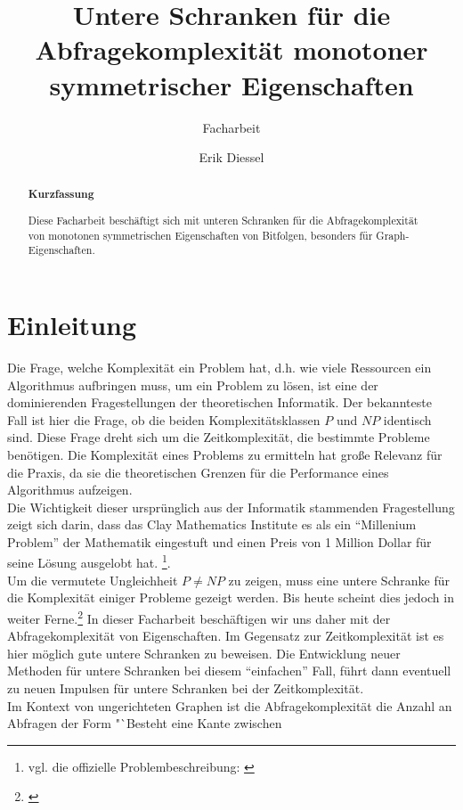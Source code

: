 \documentclass[a4paper]{scrreprt}
\title{Untere Schranken für die Abfragekomplexität 
       monotoner symmetrischer Eigenschaften}
\subtitle{Facharbeit}
\author{Erik Diessel}
\theoremstyle{definition}
\begin{document}
\maketitle

\begin{abstract}
\begin{center}
\bf{Kurzfassung}
\end{center}
Diese Facharbeit beschäftigt sich mit unteren Schranken
für die Abfragekomplexität von monotonen symmetrischen
Eigenschaften von Bitfolgen, besonders für Graph-Eigenschaften.
\end{abstract}

\tableofcontents
\thispagestyle{empty}

\chapter{Einleitung}
Die Frage, welche Komplexität ein Problem hat, d.h.
wie viele Ressourcen ein Algorithmus aufbringen muss,
um ein Problem zu lösen, ist eine der dominierenden
Fragestellungen der theoretischen Informatik.
Der bekannteste Fall ist hier die Frage, ob die beiden
Komplexitätsklassen $P$ und $NP$ identisch sind. Diese
Frage dreht sich um die Zeitkomplexität, die bestimmte
Probleme benötigen. Die Komplexität eines Problems zu ermitteln hat
große Relevanz für die Praxis, da sie die theoretischen
Grenzen für die Performance eines Algorithmus aufzeigen. \\
Die Wichtigkeit dieser ursprünglich aus der Informatik
stammenden Fragestellung zeigt sich darin, dass das Clay
Mathematics Institute es als ein "`Millenium Problem"'
der Mathematik eingestuft und einen Preis von
1 Million Dollar für seine Lösung ausgelobt hat.
\footnote{vgl. die offizielle Problembeschreibung:
\cite{PvsNPOfficial}}. \\
Um die vermutete Ungleichheit $P\neq NP$ zu zeigen,
muss eine untere Schranke für die Komplexität einiger
Probleme gezeigt werden. Bis heute scheint dies jedoch
in weiter Ferne.\footnote{\cite{PvsNP}}
In dieser Facharbeit beschäftigen wir uns daher mit
der  Abfragekomplexität von Eigenschaften. Im Gegensatz
zur Zeitkomplexität ist es hier möglich gute
untere Schranken zu beweisen. Die Entwicklung
neuer Methoden für untere Schranken bei diesem "`einfachen"' Fall,
führt dann eventuell zu neuen Impulsen für untere
Schranken bei der Zeitkomplexität. \\
Im Kontext von ungerichteten Graphen
ist die Abfragekomplexität die Anzahl
an Abfragen der Form "`Besteht eine Kante zwischen
\end{document}
